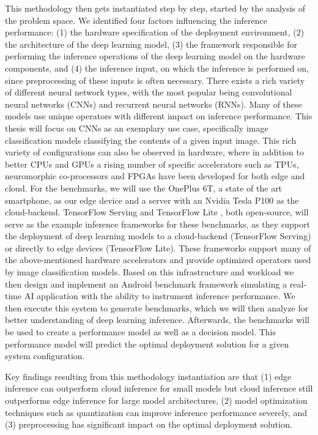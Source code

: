This methodology then gets instantiated step by step, started by the analysis of the problem space.
We identified four factors influencing the inference performance: (1) the hardware specification of the deployment environment, (2) the architecture of the deep learning model, (3) the framework responsible for performing the inference operations of the deep learning model on the hardware components, and (4) the inference input, on which the inference is performed on, since preprocessing of these inputs is often necessary.
There exists a rich variety of different neural network types, with the most popular being convolutional neural networks (CNNs) and recurrent neural networks (RNNs).
Many of these models use unique operators with different impact on inference performance.
This thesis will focus on CNNs as an exemplary use case, specifically image classification models classifying the contents of a given input image.
This rich variety of configurations can also be observed in hardware, where in addition to better CPUs and GPUs a rising number of specific accelerators such as TPUs, neuromorphic co-processors and FPGAs have been developed for both edge and cloud.
For the benchmarks, we will use the OnePlus 6T, a state of the art smartphone, as our edge device and a server with an Nvidia Tesla P100 as the cloud-backend.
TensorFlow Serving \cite{tfServing} and TensorFlow Lite \cite{tfLite}, both open-source, will serve as the example inference frameworks for these benchmarks, as they support the deployment of deep learning models to a cloud-backend (TensorFlow Serving) or directly to edge devices (TensorFlow Lite). These frameworks support many of the above-mentioned hardware accelerators and provide optimized operators used by image classification models.
Based on this infrastructure and workload we then design and implement an Android benchmark framework simulating a real-time AI application with the ability to instrument inference performance.
We then execute this system to generate benchmarks, which we will then analyze for better understanding of deep learning inference. Afterwards, the benchmarks will be used to create a performance model as well as a decision model.
This performance model will predict the optimal deployment solution for a given system configuration.

Key findings resulting from this methodology instantiation are that (1) edge inference can outperform cloud inference for small models but cloud inference still outperforms edge inference for large model architectures, (2) model optimization techniques such as quantization can improve inference performance severely, and (3) preprocessing has significant impact on the optimal deployment solution.

